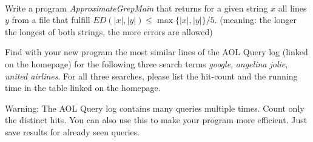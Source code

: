  \\
Write a program \emph{ApproximateGrepMain} that returns for a given string $x$ 
all lines $y$ from a file that fulfill $ED(|x|, |y|) \le \max\{|x|,|y|\} / 5$.
(meaning: the longer the longest of both strings, the more errors are allowed)

Find with your new program the most similar lines of the AOL Query log (linked 
on the homepage) for the following three search terms 
\emph{google},
\emph{angelina jolie},
\emph{united airlines}.
For all three searches, please list the hit-count and the running time in the 
table linked on the homepage.

Warning: The AOL Query log contains many queries multiple times. Count only the 
distinct hits.
You can also use this to make your program more efficient. Just save results 
for already seen queries.